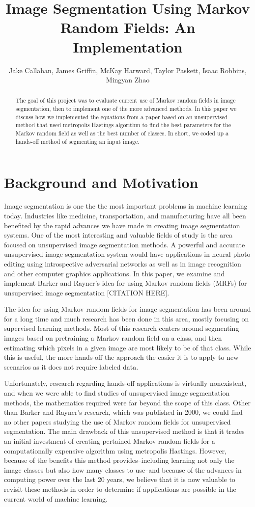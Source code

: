 \documentclass[11pt]{article}
\title{Image Segmentation Using Markov Random Fields: An Implementation}
\author{Jake Callahan, James Griffin, McKay Harward, Taylor Paskett, Isaac Robbins, Mingyan Zhao}
\begin{document}
\maketitle
\begin{abstract}
The goal of this project was to evaluate current use of Markov random fields in image segmentation, then to implement one of the more advanced methods. In this paper we discuss how we implemented the equations from a paper based on an unsupervised method that used metropolis Hastings algorithm to find the best parameters for the Markov random field as well as the best number of classes. In short, we coded up a hands-off method of segmenting an input image.
\end{abstract}

\section{Background and Motivation}
Image segmentation is one the the most important problems in machine learning today. Industries like medicine, transportation, and manufacturing have all been benefited by the rapid advances we have made in creating image segmentation systems. 
One of the most interesting and valuable fields of study is the area focused on unsupervised image segmentation methods. 
A powerful and accurate unsupervised image segmentation system would have applications in neural photo editing using introspective adversarial networks as well as in image recognition and other computer graphics applications. In this paper, we examine and implement Barker and Rayner's idea for using Markov random fields (MRFs) for unsupervised image segmentation [CITATION HERE].

 The idea for using Markov random fields for image segmentation has been around for a long time and much research has been done in this area, mostly focusing on supervised learning methods. 
 Most of this research centers around segmenting images based on pretraining a Markov random field on a class, and then estimating which pixels in a given image are most likely to be of that class. While this is useful, the more hands-off the approach the easier it is to apply to new scenarios as it does not require labeled data. 
 
 Unfortunately, research regarding hands-off applications is virtually nonexistent, and when we were able to find studies of unsupervised image segmentation methods, the mathematics required were far beyond the scope of this class.
 Other than Barker and Rayner's research, which was published in 2000, we could find no other papers studying the use of Markov random fields for unsupervised segmentation. 
 The main drawback of this unsupervised method is that it trades an initial investment of creating pertained Markov random fields for a computationally expensive algorithm using metropolis Hastings.
 However, because of the benefits this method provides--including learning not only the image classes but also how many classes to use--and because of the advances in computing power over the last 20 years, we believe that it is now valuable to revisit these methods in order to determine if applications are possible in the current world of machine learning.
\end{document}
